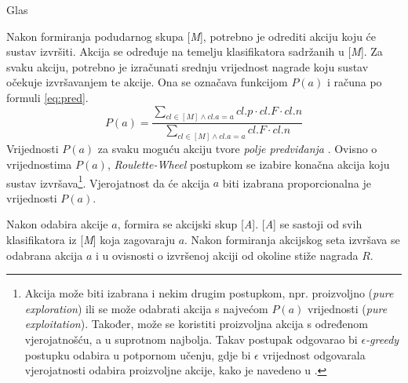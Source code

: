 \documentclass[times, utf8, zavrsni]{fer}
\begin{document}
\begin{algorithm}
    \caption{Glas}
    \label{vote}
    \begin{algorithmic}
        \ENDIF
    \end{algorithmic}
\end{algorithm}

Nakon formiranja podudarnog skupa [\emph{M}], potrebno je odrediti akciju koju će sustav izvršiti.
Akcija se određuje na temelju klasifikatora sadržanih u [\emph{M}].
Za svaku akciju, potrebno je izračunati srednju vrijednost nagrade koju sustav očekuje izvršavanjem te akcije.
Ona se označava funkcijom $P(a)$ i računa po formuli \eqref{eq:pred}.
\begin{equation}
    \label{eq:pred}
    P(a) = \frac{\sum_{cl \in [M] \land cl.a = a} cl.p \cdot cl.F \cdot cl.n}{\sum_{cl \in [M] \land cl.a = a} cl.F \cdot cl.n}
\end{equation}
Vrijednosti $P(a)$ za svaku moguću akciju tvore \emph{polje predviđanja} .
Ovisno o vrijednostima $P(a)$, \emph{Roulette-Wheel} postupkom se izabire konačna akcija koju sustav izvršava\footnote{
Akcija može biti izabrana i nekim drugim postupkom, npr. proizvoljno (\emph{pure exploration}) ili se može odabrati akcija s najvećom $P(a)$ vrijednosti (\emph{pure exploitation}).
Također, može se koristiti proizvoljna akcija s određenom vjerojatnošću, a u suprotnom najbolja.
Takav postupak odgovarao bi \emph{$\epsilon$-greedy} postupku odabira u potpornom učenju, gdje bi $\epsilon$ vrijednost odgovarala vjerojatnosti odabira proizvoljne akcije, kako je navedeno u \citep{1}.}.
Vjerojatnost da će akcija $a$ biti izabrana proporcionalna je vrijednosti $P(a)$.

Nakon odabira akcije $a$, formira se akcijski skup  [\emph{A}].
[\emph{A}] se sastoji od svih klasifikatora iz [\emph{M}] koja zagovaraju $a$.
Nakon formiranja akcijskog seta izvršava se odabrana akcija $a$ i u ovisnosti o izvršenoj akciji od okoline stiže nagrada $R$.
\end{document}
